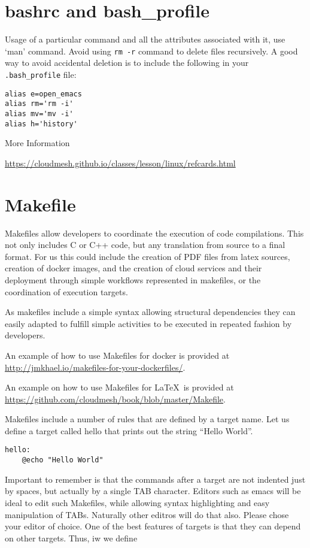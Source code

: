 \section{bashrc and bash\_profile}

Usage of a particular command and all the attributes associated with it,
use `man' command. Avoid using \verb|rm -r| command to delete files
recursively. A good way to avoid accidental deletion is to include the
following in your \verb|.bash_profile| file:

\begin{verbatim}
alias e=open_emacs
alias rm='rm -i'
alias mv='mv -i' 
alias h='history'
\end{verbatim}

More Information

\url{https://cloudmesh.github.io/classes/lesson/linux/refcards.html}

\section{Makefile}
\label{s:makefile}

Makefiles allow developers to coordinate the execution of code
compilations. This not only includes C or C++ code, but any
translation from source to a final format. For us this could include
the creation of PDF files from latex sources, creation of docker
images, and the creation of cloud services and their deployment
through simple workflows represented in makefiles, or the coordination
of execution targets.

As makefiles include a simple syntax allowing structural dependencies
they can easily adapted to fulfill simple activities to be executed in
repeated fashion by developers.

An example of how to use Makefiles for docker is provided at
\url{http://jmkhael.io/makefiles-for-your-dockerfiles/}.

An example on how to use Makefiles for \LaTeX~is provided at
\url{https://github.com/cloudmesh/book/blob/master/Makefile}.

Makefiles include a number of rules that are defined by a target
name. Let us define a target called hello that prints out the string
``Hello World''.

\begin{lstlisting} 
hello:
    @echo "Hello World"
\end{lstlisting} 

Important to remember is that the commands after a target are not
indented just by spaces, but actually by a single TAB
character. Editors such as emacs will be ideal to edit such Makefiles,
while allowing syntax highlighting and easy manipulation of
TABs. Naturally other editros will do that also. Please chose your
editor of choice. One of the best features of targets is that they can
depend on other targets. Thus, iw we define

